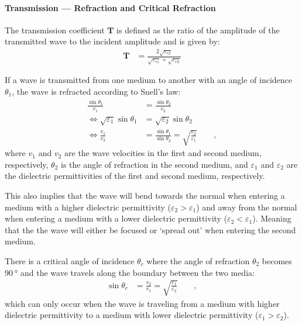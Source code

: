 \paragraph{Transmission --- Refraction and Critical Refraction}
The transmission coefficient \(\mathbf{T}\) is defined as the ratio of the amplitude of the transmitted wave to the incident amplitude and is given by:
\begin{align}
    \mathbf{T} &= \frac{2\sqrt{\varepsilon_{r2}}}{\sqrt{\varepsilon_{r1}} + \sqrt{\varepsilon_{r2}}}\label{al:transmission_coefficient}
\end{align}

If a wave is transmitted from one medium to another with an angle of incidence \(\theta_1\), the wave is refracted according to Snell's law:
\begin{align}
    \frac{\sin \theta_1}{v_1} &= \frac{\sin \theta_2}{v_2} \label{al:snells_law} \\
    \Leftrightarrow \sqrt{\varepsilon_1} \sin \theta_1 &= \sqrt{\varepsilon_2} \sin \theta_2 \\
    \Leftrightarrow \frac{v_1}{v_2} &= \frac{\sin \theta_1}{\sin \theta_2} = \sqrt{\frac{\varepsilon_2}{\varepsilon_1}} \qquad ,
\end{align}
where \(v_1\) and \(v_2\) are the wave velocities in the first and second medium, respectively, \(\theta_2\) is the angle of refraction in the second medium, and \(\varepsilon_1\) and \(\varepsilon_2\) are the dielectric permittivities of the first and second medium, respectively.

This also implies that the wave will bend towards the normal when entering a medium with a higher dielectric permittivity (\(\varepsilon_2 > \varepsilon_1\)) and away from the normal when entering a medium with a lower dielectric permittivity (\(\varepsilon_2 < \varepsilon_1\)). 
Meaning that the the wave will either be focused or `spread out' when entering the second medium.

There is a critical angle of incidence \(\theta_c\) where the angle of refraction \(\theta_2\) becomes \(\SI{90}{\degree}\) and the wave travels along the boundary between the two media:
\begin{align}
    \sin \theta_c &= \frac{v_2}{v_1} = \sqrt{\frac{\varepsilon_1}{\varepsilon_2}} \qquad ,\label{al:critical_angle}
\end{align}
which can only occur when the wave is traveling from a medium with higher dielectric permittivity to a medium with lower dielectric permittivity (\(\varepsilon_1 > \varepsilon_2\)).

